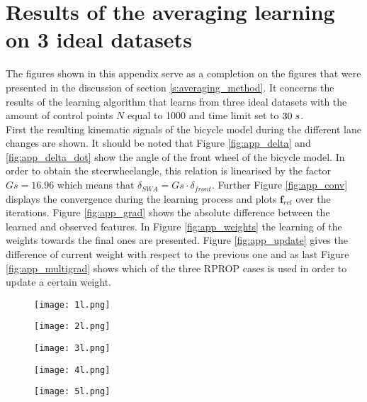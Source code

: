 \chapter{Results of the averaging learning on 3 ideal datasets}
\label{app:C}
The figures shown in this appendix serve as a completion on the figures that were presented in the discussion of section \ref{s:averaging_method}. It concerns the results of the learning algorithm that learns from three ideal datasets with the amount of control points $N$ equal to 1000 and time limit set to $30 \hspace{1mm}s$.\\ First the resulting kinematic signals of the bicycle model during the different lane changes are shown. It should be noted that Figure \ref{fig:app_delta} and \ref{fig:app_delta_dot} show the angle of the front wheel of the bicycle model. In order to obtain the steerwheelangle, this relation is linearised by the factor $Gs = 16.96$ which means that $\delta_{SWA} = Gs\cdot\delta_{front}$. Further Figure \ref{fig:app_conv} displays the convergence during the learning process and plots $\bm{f}_{rel}$ over the iterations. Figure \ref{fig:app_grad} shows the absolute difference between the learned and observed features. In Figure \ref{fig:app_weights} the learning of the weights towards the final ones are presented. Figure \ref{fig:app_update} gives the difference of current weight with respect to the previous one and as last Figure \ref{fig:app_multigrad} shows which of the three RPROP cases is used in order to update a certain weight. 

 
\begin{figure}[h!]
	\texttt{[image: 1l.png]}
\end{figure}

\begin{figure}[h!]
	\centering
	\texttt{[image: 2l.png]}
	\label{fig:lat_acc_val}
\end{figure}

\begin{figure}[h!]
	\centering
	\texttt{[image: 3l.png]}
	\label{fig:lat_acc_val}
\end{figure}


\begin{figure}[h!]
	\centering
	\texttt{[image: 4l.png]}
	\label{fig:lat_acc_val}
\end{figure}


\begin{figure}[h!]
	\centering
	\texttt{[image: 5l.png]}
	\label{fig:lat_acc_val}
\end{figure}


